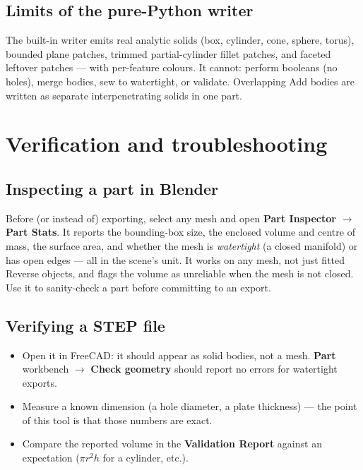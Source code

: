 \documentclass[11pt,a4paper]{article}
\newcommand{\ui}[1]{\textsf{\textbf{#1}}}   %
\begin{document}
\subsection{Limits of the pure-Python writer}
\label{sec:purepython}

The built-in writer emits real analytic solids (box, cylinder, cone, sphere,
torus), bounded plane patches, trimmed partial-cylinder fillet patches, and
faceted leftover patches --- with per-feature colours. It cannot: perform
booleans (no holes), merge bodies, sew to watertight, or validate. Overlapping
Add bodies are written as separate interpenetrating solids in one part.

\section{Verification and troubleshooting}

\subsection{Inspecting a part in Blender}

Before (or instead of) exporting, select any mesh and open \ui{Part
Inspector} $\to$ \ui{Part Stats}. It reports the bounding-box size, the
enclosed volume and centre of mass, the surface area, and whether the mesh is
\emph{watertight} (a closed manifold) or has open edges --- all in the scene's
unit. It works on any mesh, not just fitted Reverse objects, and flags the
volume as unreliable when the mesh is not closed. Use it to sanity-check a part
before committing to an export.

\subsection{Verifying a STEP file}

\begin{itemize}[nosep]
  \item Open it in FreeCAD: it should appear as solid bodies, not a mesh.
    \ui{Part} workbench $\to$ \ui{Check geometry} should report no errors for
    watertight exports.
  \item Measure a known dimension (a hole diameter, a plate thickness) ---
    the point of this tool is that those numbers are exact.
  \item Compare the reported volume in the \ui{Validation Report} against an
    expectation ($\pi r^2 h$ for a cylinder, etc.).
\end{itemize}
\end{document}

